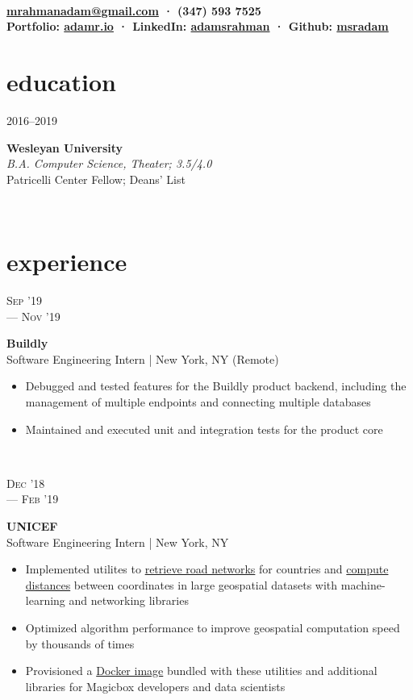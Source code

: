 \documentclass[letterpaper, 10.5pt]{article}
\author{Adam Rahman}
\makeatletter
\renewcommand{\maketitle}{
	\hspace{.125\textwidth}
	\begin{minipage}[t]{.75\textwidth}
    \begin{center}
        \fontsize{16pt}{15pt}\selectfont\bfseries \theauthor \\
        \fontsize{10pt}{15pt}\selectfont\sf
        \href{mailto:mrahmanadam@gmail.com}{mrahmanadam@gmail.com} · (347) 593 7525 \\
        Portfolio: \href{http://adamr.io}{adamr.io} · 
        LinkedIn: \href{https://www.linkedin.com/in/adamsrahman/}{adamsrahman} · 
        Github: \href{https://github.com/msradam}{msradam}  \\ 
        \end{center}
    \end{minipage}}
\newcommand{\eduentry}[4]{
    \begin{minipage}[t]{.15\linewidth}
    \hfill \textsc{#1}
    \end{minipage}
    \hfill\vline\hfill
    \begin{minipage}[t]{.80\linewidth}
    {\bf\large#2}
    \vspace{1pt}
    \\\textit{#3} \small{#4}
    \end{minipage}\\
    \vspace{.10cm}
    }
\newcommand{\expentry}[5]{
    \begin{minipage}[t]{.15\linewidth}
    \hfill \textsc{#1} \\
    \hfill \hspace*{5pt}\hfill --- \textsc{#2}
    \end{minipage}
    \hfill\vline\hfill
    \begin{minipage}[t]{.80\linewidth}
    {\bf\large#3}
    \\ #4 
    \vspace{-1.5mm}
    \small{#5}
    \end{minipage}\\
    \vspace{.10cm}
    }
\makeatother
\begin{document}
    \maketitle
    \vspace{.10cm}


    \section{education}
    \eduentry{2016--2019}
    {Wesleyan University}
    {B.A. Computer Science, Theater; 3.5/4.0}
    {\\ Patricelli Center Fellow; Deans' List}

    \section{experience}
    \expentry{Sep '19}
    {Nov '19}
    {Buildly}
    {Software Engineering Intern | New York, NY (Remote)}
    {

        \begin{itemize}{\leftmargin=0.5em \itemindent=0em}
          \setlength\itemsep{0.1mm}
          \item Debugged and tested features for the Buildly product backend, including the management of multiple endpoints and connecting multiple databases
          \item Maintained and executed unit and integration tests for the product core 
        \end{itemize}
        
    }

    \expentry{Dec '18}
    {Feb '19}
    {UNICEF}
    {Software Engineering Intern | New York, NY}
    {

        \begin{itemize}{\leftmargin=0.5em \itemindent=0em}
          \setlength\itemsep{0.1mm}
          \item Implemented utilites to \href{https://github.com/unicef/magicbox-download-roads}{retrieve road networks} for countries and \href{https://github.com/msradam/magicbox-site-routing}{compute distances} between coordinates in large geospatial datasets with machine-learning and networking libraries
          \item Optimized algorithm performance to improve geospatial computation speed by thousands of times 
          \item Provisioned a \href{https://hub.docker.com/r/msradam/magicbox-tools}{Docker image} bundled with these utilities and additional libraries for Magicbox developers and data scientists
        \end{itemize}
        
    }
\end{document}
